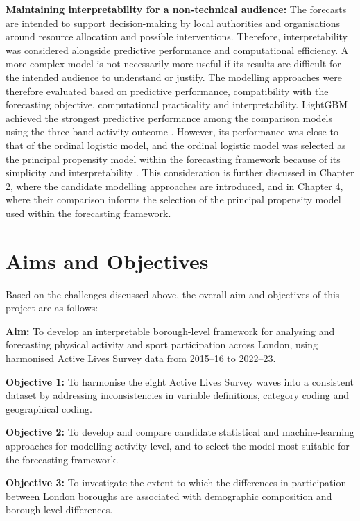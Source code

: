\documentclass[ %
                    author={Ashrey Ashrey, Sanya Kapoor, Trisha Sharma, Yash Bhooshan Pandloskar},
                supervisor={Dr. Dalila O’Grady},
                    degree={MSc},
                     title={Using machine learning to forecast physical activity participation, volunteering and activity patterns in London},
                  subtitle={},
                      type={},
                      year={2021}]{dissertation}
\begin{document}
\textbf{Maintaining interpretability for a non-technical audience:}
The forecasts are intended to support decision-making by local authorities and organisations around resource allocation and possible interventions. Therefore, interpretability was considered alongside predictive performance and computational efficiency. A more complex model is not necessarily more useful if its results are difficult for the intended audience to understand or justify. The modelling approaches were therefore evaluated based on predictive performance, compatibility with the forecasting objective, computational practicality and interpretability. LightGBM achieved the strongest predictive performance among the comparison models using the three-band activity outcome \cite{ke_etal_2017}. However, its performance was close to that of the ordinal logistic model, and the ordinal logistic model was selected as the principal propensity model within the forecasting framework because of its simplicity and interpretability \cite{mccullagh_1980}.
This consideration is further discussed in Chapter 2, where the candidate modelling approaches are introduced, and in Chapter 4, where their comparison informs the selection of the principal propensity model used within the forecasting framework.


\section{Aims and Objectives}

Based on the challenges discussed above, the overall aim and objectives of this project are as follows:

\textbf{Aim:} To develop an interpretable borough-level framework for analysing and forecasting physical activity and sport participation across London, using harmonised Active Lives Survey data from 2015--16 to 2022--23.

\textbf{Objective 1:} To harmonise the eight Active Lives Survey waves into a consistent dataset by addressing inconsistencies in variable definitions, category coding and geographical coding.

\textbf{Objective 2:} To develop and compare candidate statistical and machine-learning approaches for modelling activity level, and to select the model most suitable for the forecasting framework.

\textbf{Objective 3:} To investigate the extent to which the differences in participation between London boroughs are associated with demographic composition and borough-level differences.
\end{document}
